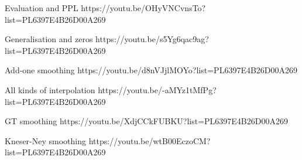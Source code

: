 Evaluation and PPL
https://youtu.be/OHyVNCvnsTo?list=PL6397E4B26D00A269

Generalisation and zeros
https://youtu.be/s5Yg6qac9ag?list=PL6397E4B26D00A269

Add-one smoothing
https://youtu.be/d8nVJjlMOYo?list=PL6397E4B26D00A269

All kinds of interpolation
https://youtu.be/-aMYz1tMfPg?list=PL6397E4B26D00A269

GT smoothing
https://youtu.be/XdjCCkFUBKU?list=PL6397E4B26D00A269

Kneser-Ney smoothing
https://youtu.be/wtB00EczoCM?list=PL6397E4B26D00A269
